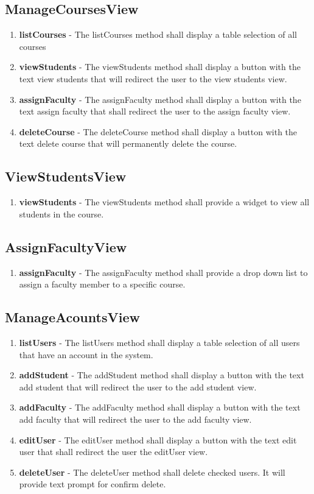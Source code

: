 \documentclass[letterpaper,12pt,oneside,listof=totoc]{scrreprt}
\begin{document}
\subsection{ManageCoursesView}
\begin{enumerate}
    \item \textbf{listCourses} - The listCourses method shall display a table selection of all courses
    \item \textbf{viewStudents} - The viewStudents method shall display a button with the text view students that will redirect the user to the view students view.
    \item \textbf{assignFaculty} - The assignFaculty method shall display a button with the text assign faculty that shall redirect the user to the assign faculty view.
    \item \textbf{deleteCourse} - The deleteCourse method shall display a button with the text delete course that will permanently delete the course.
\end{enumerate}

\subsection{ViewStudentsView}
\begin{enumerate}
    \item \textbf{viewStudents} - The viewStudents method shall provide a widget to view all students in the course.
\end{enumerate}

\subsection{AssignFacultyView}
\begin{enumerate}
    \item \textbf{assignFaculty} - The assignFaculty method shall provide a drop down list to assign a faculty member to a specific course.
\end{enumerate}

\subsection{ManageAcountsView}
\begin{enumerate}
    \item \textbf{listUsers} - The listUsers method shall display a table selection of all users that have an account in the system.
    \item \textbf{addStudent} - The addStudent method shall display a button with the text add student that will redirect the user to the add student view.
    \item \textbf{addFaculty} - The addFaculty method shall display a button with the text add faculty that will redirect the user to the add faculty view.
    \item \textbf{editUser} - The editUser method shall display a button with the text edit user that shall redirect the user the editUser view.
    \item \textbf{deleteUser} - The deleteUser method shall delete checked users. It will provide text prompt for confirm delete.
\end{enumerate}
\end{document}

